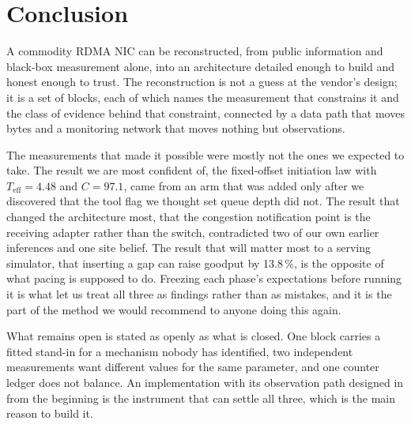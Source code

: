 \section{Conclusion}
\label{sec:conclusion}

A commodity RDMA NIC can be reconstructed, from public information and
black-box measurement alone, into an architecture detailed enough to build and
honest enough to trust. The reconstruction is not a guess at the vendor's
design; it is a set of blocks, each of which names the measurement that
constrains it and the class of evidence behind that constraint, connected by a
data path that moves bytes and a monitoring network that moves nothing but
observations.

The measurements that made it possible were mostly not the ones we expected to
take. The result we are most confident of, the fixed-offset initiation law with
$T_{\text{eff}} = 4.48$\uS{} and $C = 97.1$\Gbps{}, came from an arm that was
added only after we discovered that the tool flag we thought set queue depth
did not. The result that changed the architecture most, that the congestion
notification point is the receiving adapter rather than the switch, contradicted
two of our own earlier inferences and one site belief. The result that will
matter most to a serving simulator, that inserting a gap can raise goodput by
13.8\,\%, is the opposite of what pacing is supposed to do. Freezing each
phase's expectations before running it is what let us treat all three as
findings rather than as mistakes, and it is the part of the method we would
recommend to anyone doing this again.

What remains open is stated as openly as what is closed. One block carries a
fitted stand-in for a mechanism nobody has identified, two independent
measurements want different values for the same parameter, and one counter
ledger does not balance. An implementation with its observation path designed in
from the beginning is the instrument that can settle all three, which is the
main reason to build it.
